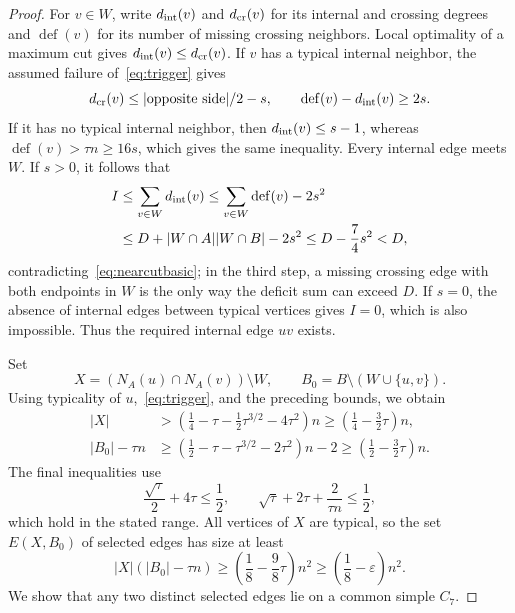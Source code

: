 \begin{proof}
For $v\in W$, write $d_{\rm int}(v)$ and $d_{\rm cr}(v)$ for its internal and crossing degrees and $\operatorname{def}(v)$ for its number of missing crossing neighbors. Local optimality of a maximum cut gives $d_{\rm int}(v)\le d_{\rm cr}(v)$. If $v$ has a typical internal neighbor, the assumed failure of~\eqref{eq:trigger} gives
\[
 d_{\rm cr}(v)\le |\text{opposite side}|/2-s,
 \qquad \operatorname{def}(v)-d_{\rm int}(v)\ge2s.
\]
If it has no typical internal neighbor, then $d_{\rm int}(v)\le s-1$, whereas $\operatorname{def}(v)>\tau n\ge16s$, which gives the same inequality. Every internal edge meets $W$. If $s>0$, it follows that
\begin{align*}
 I&\le\sum_{v\in W}d_{\rm int}(v)
 \le\sum_{v\in W}\operatorname{def}(v)-2s^2\\
 &\le D+|W\cap A||W\cap B|-2s^2
 \le D-\frac74s^2<D,
\end{align*}
contradicting~\eqref{eq:nearcutbasic}; in the third step, a missing crossing edge with both endpoints in $W$ is the only way the deficit sum can exceed $D$. If $s=0$, the absence of internal edges between typical vertices gives $I=0$, which is also impossible. Thus the required internal edge $uv$ exists.

Set
\[
 X=(N_A(u)\cap N_A(v))\setminus W,
 \qquad B_0=B\setminus(W\cup\{u,v\}).
\]
Using typicality of $u$,~\eqref{eq:trigger}, and the preceding bounds, we obtain
\begin{align}
 |X|&>\left(\frac14-\tau-\frac12\tau^{3/2}-4\tau^2\right)n
 \ge\left(\frac14-\frac32\tau\right)n,\label{eq:nearX}\\
 |B_0|-\tau n
 &\ge\left(\frac12-\tau-\tau^{3/2}-2\tau^2\right)n-2
 \ge\left(\frac12-\frac32\tau\right)n.\label{eq:nearB}
\end{align}
The final inequalities use
\[
 \frac{\sqrt\tau}{2}+4\tau\le\frac12,
 \qquad \sqrt\tau+2\tau+\frac{2}{\tau n}\le\frac12,
\]
which hold in the stated range. All vertices of $X$ are typical, so the set $E(X,B_0)$ of selected edges has size at least
\begin{equation}\label{eq:nearcount}
 |X|(|B_0|-\tau n)
 \ge\left(\frac18-\frac98\tau\right)n^2
 \ge\left(\frac18-\varepsilon\right)n^2.
\end{equation}
We show that any two distinct selected edges lie on a common simple $C_7$.


\end{proof}
